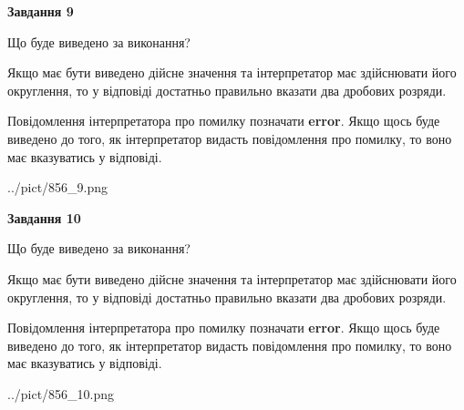 \documentclass[12pt, ukrainian]{article}
\begin{document}
{\begin {Large}
{\begin {center}\textbf{Завдання 9}\end {center}}\par
Що буде виведено за виконання? \par

Якщо має бути виведено дійсне значення та інтерпретатор має здійснювати його округлення, 
то у відповіді достатньо правильно вказати два дробових розряди.

Повідомлення інтерпретатора про помилку позначати \textbf{error}.
Якщо щось буде виведено до того, як інтерпретатор видасть повідомлення про помилку, 
то воно має вказуватись у відповіді. \par

\begin{center}
	{../pict/856_9.png}
\end{center}
\newpage

{\begin {center}\textbf{Завдання 10}\end {center}}\par
Що буде виведено за виконання? \par

Якщо має бути виведено дійсне значення та інтерпретатор має здійснювати його округлення, 
то у відповіді достатньо правильно вказати два дробових розряди.

Повідомлення інтерпретатора про помилку позначати \textbf{error}.
Якщо щось буде виведено до того, як інтерпретатор видасть повідомлення про помилку, 
то воно має вказуватись у відповіді. \par

\begin{center}
	{../pict/856_10.png}
\end{center}
\newpage

\end {Large}}
\end{document}
